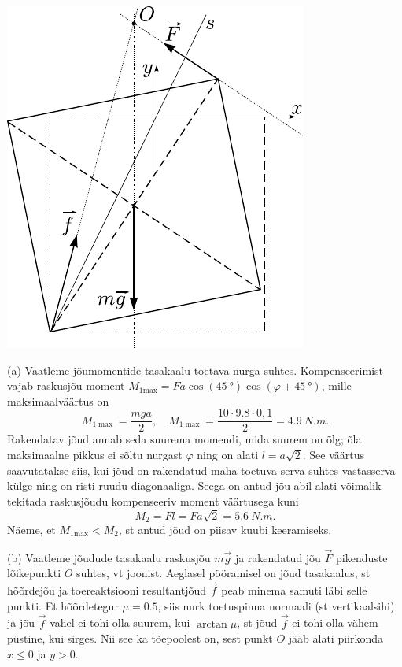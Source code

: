 \documentclass[11pt]{article}
\begin{document}
{{\begin{center}
	\includegraphics[height=0.6\textheight]{2007-v2g-09-lah}
\end{center}

(a) Vaatleme jõumomentide tasakaalu toetava nurga suhtes. Kompenseerimist vajab raskusjõu moment $M_{1 \mathrm{max}} = F a \cos (\SI{45}{\degree}) \cos (\varphi + \SI{45}{\degree})$, mille maksimaalväärtus on 
\[
M_{1 \max }=\frac{m g a}{2}, \quad M_{1 \max }=\frac{10 \cdot \num{9,8} \cdot 0,1}{2}=\SI{4,9}{N.m}.
\]
Rakendatav jõud annab seda suurema momendi, mida suurem on õlg; õla maksimaalne pikkus ei sõltu nurgast $\varphi$ ning on alati $l = a \sqrt 2$. See väärtus saavutatakse siis, kui jõud on rakendatud maha toetuva serva suhtes vastasserva külge ning on risti ruudu diagonaaliga. Seega on antud jõu abil alati võimalik tekitada raskusjõudu kompenseeriv moment väärtusega kuni
\[
M_{2}=F l=F a \sqrt{2} = \SI{5.6}{N.m}.
\]
Näeme, et $M_{1 \mathrm{max}} < M_2$, st antud jõud on piisav kuubi keeramiseks.


(b) Vaatleme jõudude tasakaalu raskusjõu $m\vec g$ ja rakendatud jõu $\vec F$ pikenduste lõikepunkti $O$ suhtes, vt joonist. Aeglasel pööramisel on jõud tasakaalus, st hõõrdejõu ja toereaktsiooni resultantjõud $\vec f$ peab minema samuti läbi selle punkti. Et hõõrdetegur $\mu = \num{0,5}$, siis nurk toetuspinna normaali (st vertikaalsihi) ja jõu $\vec f$ vahel ei tohi olla suurem, kui $\arctan \mu$, st jõud $\vec f$ ei tohi olla vähem püstine, kui sirges. Nii see ka tõepoolest on, sest punkt $O$ jääb alati piirkonda $x \leq 0$ ja $y > 0$. 

}}
\end{document}
